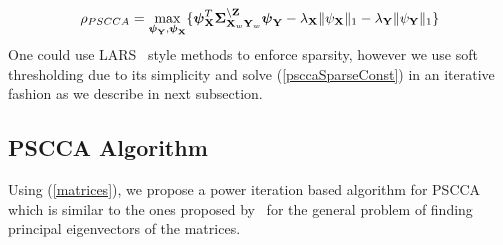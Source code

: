 \documentclass{llncs}
\newcommand{\X}{{\bf X}}
\newcommand{\Y}{{\bf Y}}
\newcommand{\Z}{{\bf Z}}
\newcommand{\bs}{\boldsymbol}
\begin{document}
\begin{equation}
\label{psccaSparseConst}
\rho_{PSCCA}=\max_{{\bs\psi_{\Y}}, {\bs\psi_{\X}}} \{ \bs\psi_{\X}^T \bs\Sigma_{\X_w\Y_w}^{\backslash \Z}\bs\psi_{\Y} - \lambda_{\X}\|\psi_{\X}\|_1 - \lambda_{\Y}\|\psi_{\Y}\|_1\}
\end{equation}
One could use LARS~\cite{lars} style methods to enforce sparsity, however we use soft thresholding due to its simplicity and solve  (\ref{psccaSparseConst}) in an iterative fashion as we describe in next subsection.






\subsection{PSCCA Algorithm}
Using (\ref{matrices}), we propose a power iteration based algorithm for PSCCA which is similar to the ones proposed by~\cite{golub} for the general problem of finding principal eigenvectors of the matrices.
\end{document}
